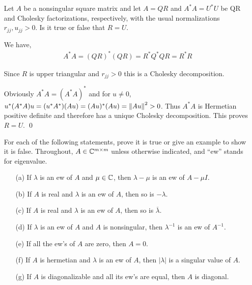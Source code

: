 \documentclass[10pt]{article}
\begin{document}
\begin{problem}[Exercise 23.1]
Let \( A \) be a nonsingular square matrix and let \( A=QR \) and \( A^*A=U^*U \) be QR and Cholesky factorizations, respectively, with the usual normalizations \( r_{jj},u_{jj}>0 \). Is it true or false that \( R=U \).
\end{problem}

\begin{solution}[Solution]
We have, 
\begin{align*}
    A^*A = (QR)^*(QR) = R^*Q^*QR = R^*R
\end{align*}

Since \( R \) is upper triangular and \( r_{jj} > 0 \) this is a Cholesky decomposition. 

Obviously \( A^*A = (A^*A)^* \) and for \( u\neq 0 \), \( u^*(A^*A)u = (u^*A^*)(Au) = (Au)^*(Au) = \left\lVert Au\right\rVert^2 > 0 \). Thus \( A^*A \) is Hermetian positive definite and therefore has a unique Cholesky decomposition. This proves \( R=U \). \qed
\end{solution}

\begin{problem}[Exercise 24.1]
For each of the following statements, prove it is true or give an example to show it is false. Throughout, \( A\in\mathbb{C}^{m\times m} \) unless otherwise indicated, and ``ew'' stands for eigenvalue.
    \begin{enumerate}
        \item[(a)] If \( \lambda \) is an ew of \( A \) and \( \mu\in\mathbb{C} \), then \( \lambda-\mu \) is an ew of \( A-\mu I \).
        \item[(b)] If \( A \) is real and \( \lambda \) is an ew of \( A \), then so is \( -\lambda \).
        \item[(c)] If \( A \) is real and \( \lambda \) is an ew of \( A \), then so is \( \overline{\lambda} \). 
        \item[(d)] If \( \lambda \) is an ew of \( A \) and \( A \) is nonsingular, then \( \lambda^{-1} \) is an ew of \( A^{-1} \).
        \item[(e)] If all the ew's of \( A \) are zero, then \( A=0 \).
        \item[(f)] If \( A \) is hermetian and \( \lambda \) is an ew of \( A \), then \( |\lambda| \) is a singular value of \( A \).
        \item[(g)] If \( A \) is diagonalizable and all its ew's are equal, then \( A \) is diagonal.
   \end{enumerate}
\end{problem}
\end{document}

